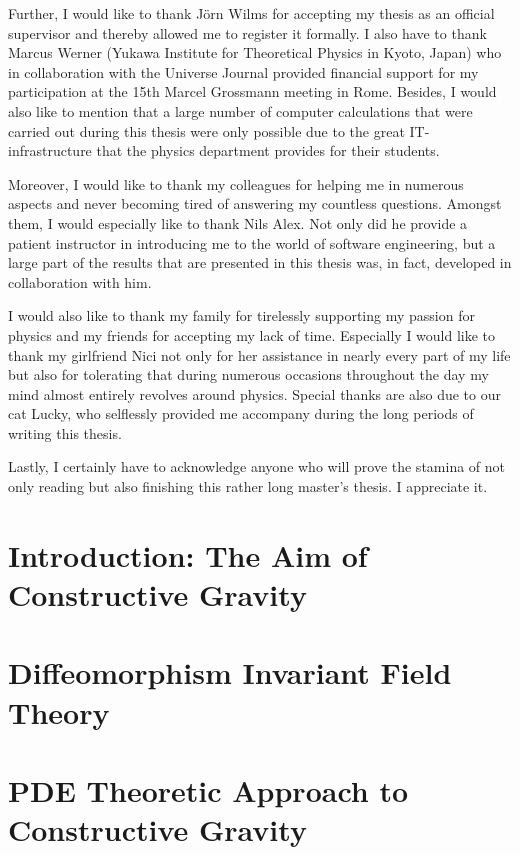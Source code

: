 \documentclass[a4paper,12pt, DIV=14, BCOR=5mm, twoside, headsepline, numbers=noenddot]{scrbook}
\begin{document}
Further, I would like to thank Jörn Wilms for accepting my thesis as an official supervisor and thereby allowed me to register it formally. 
I also have to thank Marcus Werner (Yukawa Institute for Theoretical Physics in Kyoto, Japan) who in collaboration with the Universe Journal provided financial support for my participation at the 15th Marcel Grossmann meeting in Rome. 
Besides, I would also like to mention that a large number of computer calculations that were carried out during this thesis were only possible due to the great IT-infrastructure that the physics department provides for their students. 


Moreover, I would like to thank my colleagues for helping me in numerous aspects and never becoming tired of answering my countless questions.
Amongst them, I would especially like to thank Nils Alex.
Not only did he provide a patient instructor in introducing me to the world of software engineering, 
but a large part of the results that are presented in this thesis was, in fact, developed in collaboration with him. 


I would also like to thank my family for tirelessly supporting my passion for physics and my friends for accepting my lack of time.
Especially I would like to thank my girlfriend Nici not only for her assistance in nearly every part of my life but also
for tolerating that during numerous occasions throughout the day my mind almost entirely revolves around physics. 
Special thanks are also due to our cat Lucky, who selflessly provided me accompany during the long periods of writing this thesis. 

Lastly, I certainly have to acknowledge anyone who will prove the stamina of not only reading but also finishing this rather long master's thesis. I appreciate it. 

\mainmatter

\chapter{Introduction: The Aim of Constructive Gravity}


\chapter{Diffeomorphism Invariant Field Theory}\label{chapter1}


\chapter{PDE Theoretic Approach to Constructive Gravity}\label{chapter2}
 
\end{document}
